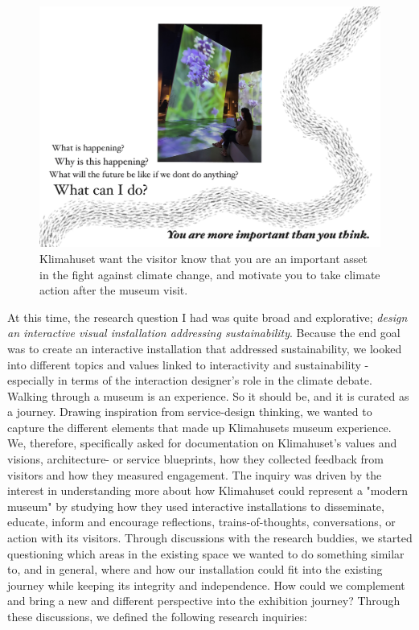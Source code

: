 \begin{figure}[H]
\includegraphics[width=12cm]{pictures/klimahuset/important.jpg}
\caption{Klimahuset want the visitor know that you are an important asset in the fight against climate change, and motivate you to take climate action after the museum visit.}
\centering 
\end{figure}

At this time, the research question I had was quite broad and explorative; \emph{design an interactive visual installation addressing sustainability}. Because the end goal was to create an interactive installation that addressed sustainability, we looked into different topics and values linked to interactivity and sustainability - especially in terms of the interaction designer's role in the climate debate. Walking through a museum is an experience. So it should be, and it is curated as a journey. Drawing inspiration from service-design thinking, we wanted to capture the different elements that made up Klimahusets museum experience. We, therefore, specifically asked for documentation on Klimahuset's values and visions, architecture- or service blueprints, how they collected feedback from visitors and how they measured engagement. The inquiry was driven by the interest in understanding more about how Klimahuset could represent a "modern museum" by studying how they used interactive installations to disseminate, educate, inform and encourage reflections, trains-of-thoughts, conversations, or action with its visitors. Through discussions with the research buddies, we started questioning which areas in the existing space we wanted to do something similar to, and in general, where and how our installation could fit into the existing journey while keeping its integrity and independence. How could we complement and bring a new and different perspective into the exhibition journey? Through these discussions, we defined the following research inquiries:

